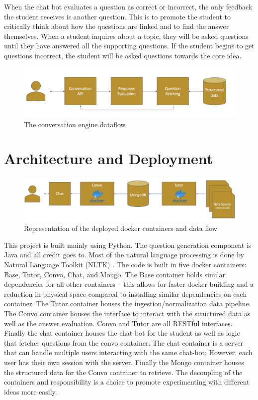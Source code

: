 \documentclass{sigchi}
\begin{document}
  When the chat bot evaluates a question as correct or incorrect, the only feedback the student receives is another question. This is to promote the student to critically think about how the questions are linked and to find the answer themselves. When a student inquires about a topic, they will be asked questions until they have answered all the supporting questions. If the student begins to get questions incorrect, the student will be asked questions towards the core idea.
  \begin{figure}[!t]
  \centering
  \includegraphics[width=6.0in]{conversation}
  \caption{The conversation engine dataflow}
  \label{conversation-flow}
  \end{figure}

  \section{Architecture and Deployment}

  \begin{figure}[!t]
  \centering
  \includegraphics[width=6.0in]{deployment}
  \caption{Representation of the deployed docker containers and data flow}
  \label{deployment-flow}
  \end{figure}

  This project is built mainly using Python. The question generation component is Java and all credit goes to\cite{Heilman}. Most of the natural language processing is done by Natural Language Toolkit (NLTK) \cite{nltk}. The code is built in five docker containers: Base, Tutor, Convo, Chat, and Mongo. The Base container holds similar dependencies for all other containers -- this allows for faster docker building and a reduction in physical space compared to installing similar dependencies on each container. The Tutor container houses the ingestion/normalization data pipeline. The Convo container houses the interface to interact with the structured data as well as the answer evaluation. Convo and Tutor are all RESTful interfaces. Finally the chat container houses the chat-bot for the student as well as logic that fetches questions from the convo container. The chat container is a server that can handle multiple users interacting with the same chat-bot; However, each user has their own session with the server. Finally the Mongo container houses the structured data for the Convo container to retrieve. The decoupling of the containers and responsibility is a choice to promote experimenting with different ideas more easily.
\end{document}
